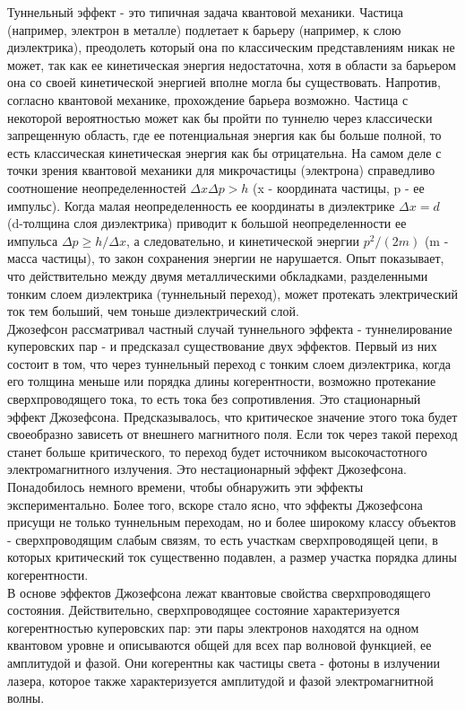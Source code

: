 \documentclass[a4paper,14pt]{article}
\begin{document}
Туннельный эффект - это типичная задача квантовой механики. Частица (например, электрон в металле) подлетает к барьеру (например, к слою диэлектрика), преодолеть который она по классическим представлениям никак не может, так как ее кинетическая энергия недостаточна, хотя в области за барьером она со своей кинетической энергией вполне могла бы существовать. Напротив, согласно квантовой механике, прохождение барьера возможно. Частица с некоторой вероятностью может как бы пройти по туннелю через классически запрещенную область, где ее потенциальная энергия как бы больше полной, то есть классическая кинетическая энергия как бы отрицательна. На самом деле с точки зрения квантовой механики для микрочастицы (электрона) справедливо соотношение неопределенностей $\Delta x \Delta p > h$ (x - координата частицы, p - ее импульс). Когда малая неопределенность ее координаты в диэлектрике $\Delta x = d$ (d-толщина слоя диэлектрика) приводит к большой неопределенности ее импульса $\Delta p \ge h / \Delta x$, а следовательно, и кинетической энергии $p^2/(2m)$ (m - масса частицы), то закон сохранения энергии не нарушается. Опыт показывает, что действительно между двумя металлическими обкладками, разделенными тонким слоем диэлектрика (туннельный переход), может протекать электрический ток тем больший, чем тоньше диэлектрический слой.\\
Джозефсон рассматривал частный случай туннельного эффекта - туннелирование куперовских пар - и предсказал существование двух эффектов. Первый из них состоит в том, что через туннельный переход с тонким слоем диэлектрика, когда его толщина меньше или порядка длины когерентности,  возможно протекание сверхпроводящего тока, то есть тока без сопротивления. Это стационарный эффект Джозефсона. Предсказывалось, что критическое значение этого тока будет своеобразно зависеть от внешнего магнитного поля. Если ток через такой переход станет больше критического, то переход будет источником высокочастотного электромагнитного излучения. Это нестационарный эффект Джозефсона.\\
Понадобилось немного времени, чтобы обнаружить эти эффекты экспериментально. Более того, вскоре стало ясно, что эффекты Джозефсона присущи не только туннельным переходам, но и более широкому классу объектов - сверхпроводящим слабым связям, то есть участкам сверхпроводящей цепи, в которых критический ток существенно подавлен, а размер участка порядка длины когерентности.\\
В основе эффектов Джозефсона лежат квантовые свойства сверхпроводящего состояния. Действительно, сверхпроводящее состояние характеризуется когерентностью куперовских пар: эти пары электронов находятся на одном квантовом уровне и описываются общей для всех пар волновой функцией, ее амплитудой и фазой. Они когерентны как частицы света - фотоны в излучении лазера, которое также характеризуется амплитудой и фазой электромагнитной волны.\\
\end{document}
